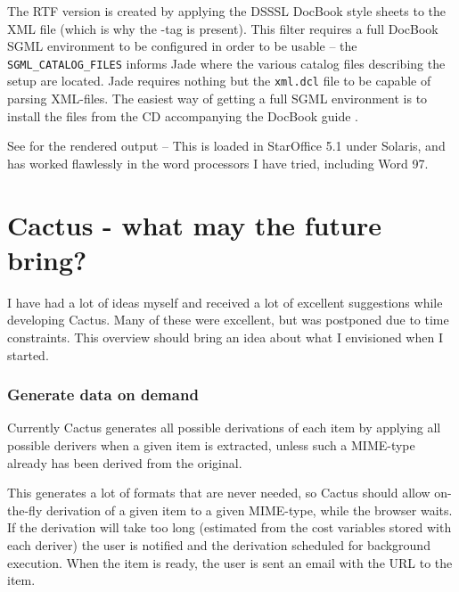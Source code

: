 The RTF version is created by applying the DSSSL DocBook style sheets
to the XML file (which is why the -tag is present).
This filter requires a full DocBook SGML environment to be configured
in order to be usable -- the \texttt{SGML_CATALOG_FILES} informs Jade
where the various catalog files describing the setup are located.
Jade requires nothing but the \texttt{xml.dcl} file to be capable of
parsing XML-files.  The easiest way of getting a full SGML environment
is to install the files from the CD accompanying the DocBook guide
\cite{walsh-muellner:docbook-the-definitive-guide}.



See  for the rendered output -- This is loaded in
  StarOffice 5.1 under Solaris, and has worked flawlessly in the word
  processors I have tried, including Word 97.






















\chapter{Cactus - what may the future bring?}

I have had a lot of ideas myself and received a lot of excellent
suggestions while developing Cactus.  Many of these were excellent,
but was postponed due to time constraints.  This overview should bring
an idea about what I envisioned when I started.

\subsection*{Generate data on demand}

Currently Cactus generates all possible derivations of each item by
applying all possible derivers when a given item is extracted, unless
such a MIME-type already has been derived from the original.

This generates a lot of formats that are never needed, so Cactus
should allow on-the-fly derivation of a given item to a given
MIME-type, while the browser waits.  If the derivation will take too
long (estimated from the cost variables stored with each deriver) the
user is notified and the derivation scheduled for background
execution.  When the item is ready, the user is sent an email with the
URL to the item.

